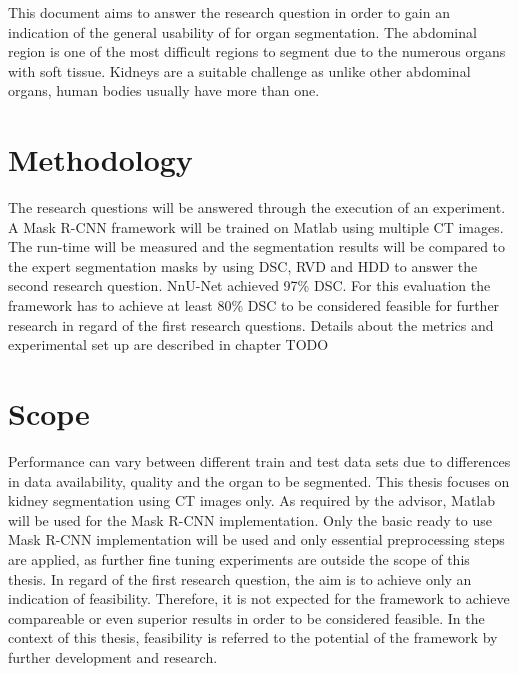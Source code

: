 This document aims to answer the research question in order to gain an indication of the general usability of   \cite{He.op.2017} for organ segmentation. The abdominal region is one of the most difficult regions to segment due to the numerous organs with soft tissue. Kidneys are a suitable challenge as unlike other abdominal organs, human bodies usually have more than one.  

\section{Methodology }

The research questions will be answered through the execution of an experiment. A  Mask R-CNN \cite{He.op.2017} framework will be trained on Matlab using multiple \ac{CT} images. The run-time will be measured and the segmentation results will be compared to the expert segmentation masks by using \ac{DSC}, \ac{RVD} and \ac{HDD} to answer the second research question.  NnU-Net\cite{Isensee.2021} achieved 97\% \ac{DSC}. For this evaluation the framework has to achieve at least 80\% \ac{DSC} to be considered feasible for further research in regard of the first research questions. Details about the metrics and experimental set up are described in chapter TODO


\section{Scope}

Performance can vary between different train and test data sets due to differences in data availability, quality and the organ to be segmented. This thesis focuses on kidney segmentation using \ac{CT} images only. As required by the advisor, Matlab will be used for the Mask R-CNN \cite{He.op.2017} implementation. Only the basic ready to use Mask R-CNN implementation will be used and only essential preprocessing steps are applied, as further fine tuning experiments are outside the scope of this thesis. In regard of the first research question, the aim is to achieve only an indication of feasibility. Therefore, it is not expected for the framework to achieve compareable or even superior results in order to be considered feasible. In the context of this thesis, feasibility is referred to the potential of the framework by further development and research. 


